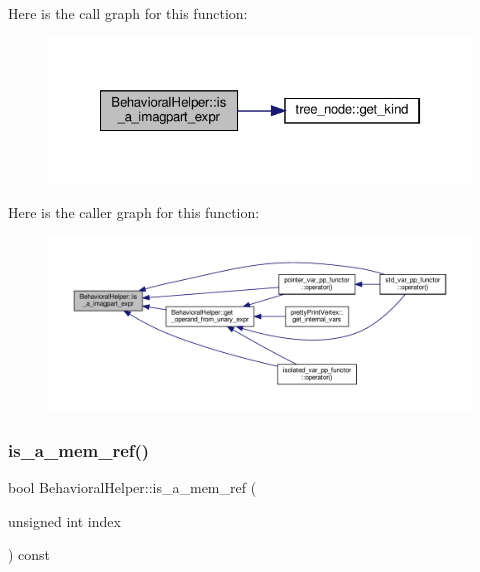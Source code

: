 Here is the call graph for this function\+:
\nopagebreak
\begin{figure}[H]
\begin{center}
\leavevmode
\includegraphics[width=322pt]{dd/db2/classBehavioralHelper_a4b2f7003179491ea4236e2cbb64fd2d9_cgraph}
\end{center}
\end{figure}
Here is the caller graph for this function\+:
\nopagebreak
\begin{figure}[H]
\begin{center}
\leavevmode
\includegraphics[width=350pt]{dd/db2/classBehavioralHelper_a4b2f7003179491ea4236e2cbb64fd2d9_icgraph}
\end{center}
\end{figure}
\mbox{\label{classBehavioralHelper_af7df51d84377f2c1dbff35b28bd027b6}} 
\subsubsection{\texorpdfstring{is\+\_\+a\+\_\+mem\+\_\+ref()}{is\_a\_mem\_ref()}}
{\footnotesize\ttfamily bool Behavioral\+Helper\+::is\+\_\+a\+\_\+mem\+\_\+ref (\begin{DoxyParamCaption}\item[{unsigned int}]{index }\end{DoxyParamCaption}) const\hspace{0.3cm}{\ttfamily [virtual]}}



